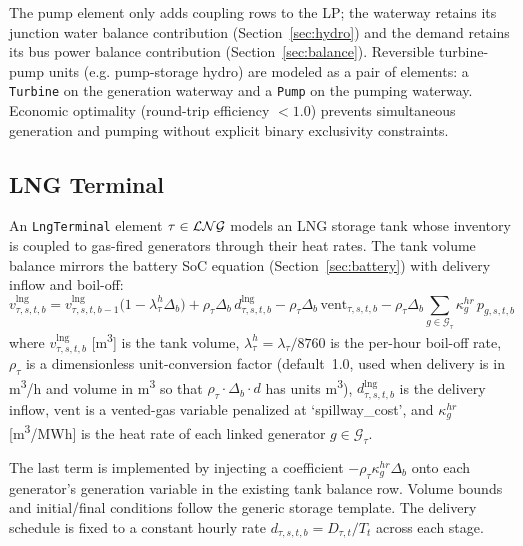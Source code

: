 The pump element only adds coupling rows to the LP; the waterway
retains its junction water balance contribution (Section~\ref{sec:hydro})
and the demand retains its bus power balance contribution
(Section~\ref{sec:balance}).  Reversible turbine-pump units (e.g.
pump-storage hydro) are modeled as a pair of elements: a
\texttt{Turbine} on the generation waterway and a \texttt{Pump} on the
pumping waterway.  Economic optimality (round-trip efficiency
$< 1.0$) prevents simultaneous generation and pumping without
explicit binary exclusivity constraints.

\subsection{LNG Terminal}
\label{sec:lng}

An \texttt{LngTerminal} element $\tau \in \mathcal{LNG}$ models an
LNG storage tank whose inventory is coupled to gas-fired generators
through their heat rates.  The tank volume balance mirrors the battery
SoC equation (Section~\ref{sec:battery}) with delivery inflow and
boil-off:
\begin{equation}
\label{eq:lng_balance}
v_{\tau,s,t,b}^{\text{lng}}
  = v_{\tau,s,t,b-1}^{\text{lng}} \bigl(1 - \lambda_\tau^h \Delta_b\bigr)
  + \rho_\tau \Delta_b \, d_{\tau,s,t,b}^{\text{lng}}
  - \rho_\tau \Delta_b \, \text{vent}_{\tau,s,t,b}
  - \rho_\tau \Delta_b
      \sum_{g \in \mathcal{G}_\tau} \kappa_g^{hr} \, p_{g,s,t,b}
\end{equation}
where $v_{\tau,s,t,b}^{\text{lng}}$ [m\textsuperscript{3}] is the tank
volume, $\lambda_\tau^h = \lambda_\tau / 8760$ is the per-hour
boil-off rate, $\rho_\tau$ is a dimensionless unit-conversion factor
(default~1.0, used when delivery is in m\textsuperscript{3}/h and volume
in m\textsuperscript{3} so that $\rho_\tau \cdot \Delta_b \cdot d$ has
units m\textsuperscript{3}),
$d_{\tau,s,t,b}^{\text{lng}}$ is the delivery inflow, $\text{vent}$
is a vented-gas variable penalized at `spillway\_cost', and
$\kappa_g^{hr}$ [m\textsuperscript{3}/MWh] is the heat rate of each
linked generator $g \in \mathcal{G}_\tau$.

The last term is implemented by injecting a coefficient
$-\rho_\tau \kappa_g^{hr} \Delta_b$ onto each generator's generation
variable in the existing tank balance row.  Volume bounds and
initial/final conditions follow the generic storage template.  The
delivery schedule is fixed to a constant hourly rate
$d_{\tau,s,t,b} = D_{\tau,t} / T_t$ across each stage.

